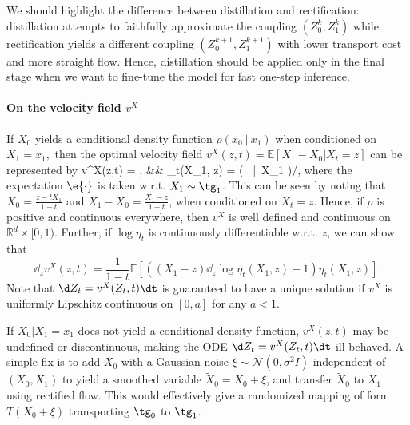\documentclass[11pt]{article}
\newcommand{\E}{\mathbb{E}}
\newcommand{\RR}{\mathbb{R}}
\newcommand{\normal}{\mathcal{N}}
\begin{document}
We should highlight the difference between  distillation and  rectification:  %
 distillation attempts to faithfully approximate the coupling $(Z_0^k,Z_1^k)$ 
 while rectification  yields a different coupling $(Z_0^{k+1}, Z_1^{k+1})$ 
 with lower transport cost and more straight flow. 
 Hence, distillation should be applied only in the final stage when we want to fine-tune the model for fast one-step inference. 


\paragraph{%
On the velocity field $v^X$}   
If  $X_0$ yields a conditional density function $\rho(x_0~|~x_1)$ when conditioned on $X_1 = x_1,$  %
then the optimal velocity field $v^X(z,t) = \E[X_1-X_0|X_t=z]$ can be represented by %
\bbb  \label{equ:vxformula}
v^X(z,t) = , 
&&
\eta_t(X_1, z) = {\rho\left ( ~\bigg |~X_1 \right )}\bigg  /{},
\eee 
where the expectation $\e{\cdot}$ is taken w.r.t. $X_1\sim \tg_1$. This can be seen by noting that $X_0 = \frac{z-t X_1}{1-t}$ and $X_1-X_0 = \frac{X_1-z}{1-t}$, when conditioned on $X_t = z$.
Hence, if  $\rho$ is positive and continuous everywhere, then $v^X$ is well defined and continuous on $\RR^d\times [0,1)$. 
Further, if $\log \eta_t$ is continuously differentiable w.r.t. $z$, we can show that 
$$
\dd_z v^X(z,t) = 
\frac{1}{1-t} \E\left [ 
\left (({X_1-z}) \dd_z \log \eta_t(X_1,z) - 1 \right ) \eta_t(X_1,z) 
\right]. 
$$
Note that $\d Z_t = v^X(Z_t,t)\dt $ 
is guaranteed to have a unique solution if 
$v^X$ is uniformly Lipschitz continuous on $[0,a]$ for any $a<1$.



If %
$X_0|X_1=x_1$ does not yield a conditional density function, 
$v^X(z,t)$ may be undefined or discontinuous, 
making the %
ODE $\d Z_t = v^X(Z_t,t)\dt$ 
ill-behaved. 
A simple fix is to add $X_0$ with a Gaussian noise $\xi \sim \normal(0, \sigma^2I)$ independent of $(X_0,X_1)$ to yield a smoothed variable $\tilde X_0 = X_0 +  \xi$, and transfer $\tilde X_0$ to $X_1$ using rectified flow.  
This would effectively give a randomized mapping of form $T(X_0 + \xi)$ transporting  $\tg_0$ to $\tg_1$. %
\end{document}
